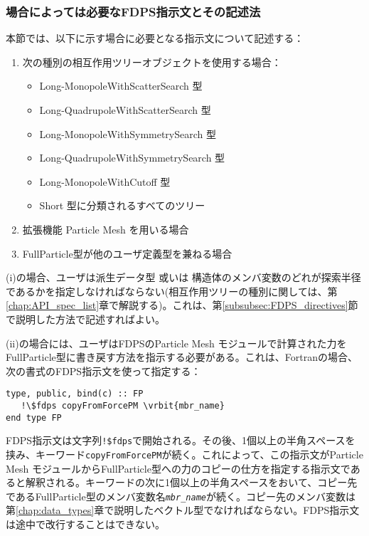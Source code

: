 \subsubsection{場合によっては必要なFDPS指示文とその記述法}
本節では、以下に示す場合に必要となる指示文について記述する：
\begin{enumerate}[leftmargin=*,itemsep=-1ex,label=(\roman*)]
\item 次の種別の相互作用ツリーオブジェクトを使用する場合：
\begin{itemize}
\item Long-MonopoleWithScatterSearch 型
\item Long-QuadrupoleWithScatterSearch 型
\item Long-MonopoleWithSymmetrySearch 型
\item Long-QuadrupoleWithSymmetrySearch 型
\item Long-MonopoleWithCutoff 型
\item Short 型に分類されるすべてのツリー
\end{itemize}
\item 拡張機能 Particle Mesh を用いる場合
\item FullParticle型が他のユーザ定義型を兼ねる場合
\end{enumerate}

(i)の場合、ユーザは派生データ型 或いは 構造体のメンバ変数のどれが探索半径であるかを指定しなければならない(相互作用ツリーの種別に関しては、第\ref{chap:API_spec_list}章で解説する)。これは、第\ref{subsubsec:FDPS_directives}節で説明した方法で記述すればよい。

(ii)の場合には、ユーザはFDPSのParticle Mesh モジュールで計算された力をFullParticle型に書き戻す方法を指示する必要がある。これは、Fortranの場合、次の書式のFDPS指示文を使って指定する：
\begin{screen}
\begin{Verbatim}[commandchars=\\\{\}]
type, public, bind(c) :: FP
   !\$fdps copyFromForcePM \vrbit{mbr_name}
end type FP
\end{Verbatim}
\end{screen}
FDPS指示文は文字列\verb|!$fdps|で開始される。その後、1個以上の半角スペースを挟み、キーワード\texttt{copyFromForcePM}が続く。これによって、この指示文がParticle Mesh モジュールからFullParticle型への力のコピーの仕方を指定する指示文であると解釈される。キーワードの次に1個以上の半角スペースをおいて、コピー先であるFullParticle型のメンバ変数名\textit{\texttt{mbr\_name}}が続く。コピー先のメンバ変数は第\ref{chap:data_types}章で説明したベクトル型でなければならない。FDPS指示文は途中で改行することはできない。

